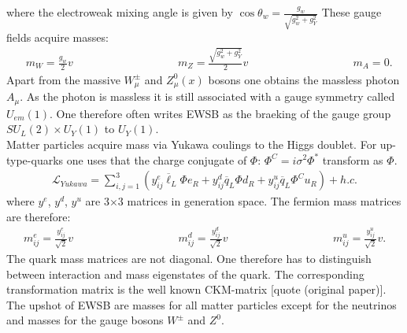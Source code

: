 where the electroweak mixing angle is given by $\cos\theta_w = \frac{g_w}{\sqrt{g_w^2 + g_Y^2}}$
These gauge fields acquire masses:
\begin{align}
& m_W = \frac{g_w}{2} v \hspace{4cm} m_Z = \frac{\sqrt{g_w^2+g_Y^2}}{2} v \hspace{4cm} m_A = 0.
\end{align}
Apart from the massive  $W^\pm_\mu$ and $Z^0_\mu(x)$ bosons one obtains the massless photon $A_\mu$. As the photon is massless it is still associated with a gauge symmetry called $U_{em}(1)$. One therefore often writes EWSB as the braeking of the gauge group $SU_L(2) \times U_Y(1)$ to $U_Y(1)$.\\
Matter particles acquire mass via Yukawa coulings to the Higgs doublet. For up-type-quarks one uses that the charge conjugate of $\Phi$: $\Phi^C = i \sigma^2 \Phi^\ast$ transform as $\Phi$.
\begin{align}
\mathcal{L}_{Yukawa} = \sum_{i,j=1}^3 \left( y_{ij}^e \overline{\ell}_L \Phi e_R  + y_{ij}^d \overline{q}_L \Phi d_R + y_{ij}^u \overline{q}_L \Phi^C u_R\right) + h.c. 
\end{align}
where $y^e$, $y^d$, $y^u$ are 3$\times$3 matrices in generation space. The fermion mass matrices are therefore:
\begin{align}
m^e_{ij} = \frac{y^e_{ij}}{\sqrt{2}} v  \hspace{4cm} m^d_{ij} = \frac{y^d_{ij}}{\sqrt{2}} v \hspace{4cm} m^u_{ij} = \frac{y^u_{ij}}{\sqrt{2}} v.
\end{align}
The quark mass matrices are not diagonal. One therefore has to distinguish between interaction and mass eigenstates of the quark. The corresponding transformation matrix is the well known CKM-matrix [quote (original paper)].\\
The upshot of EWSB are masses for all matter particles except for the neutrinos and masses for the gauge bosons $W^\pm$ and $Z^0$.


